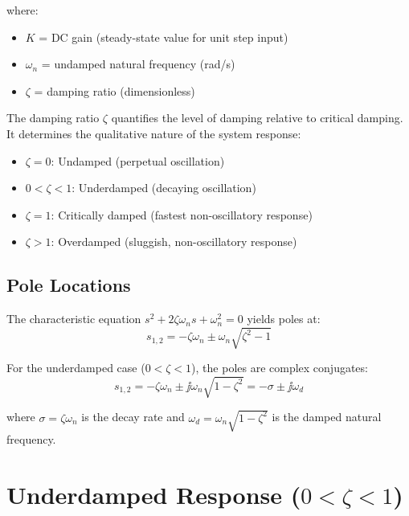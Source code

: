 where:
\begin{itemize}
    \item $K$ = DC gain (steady-state value for unit step input)
    \item $\omega_n$ = undamped natural frequency (rad/s)
    \item $\zeta$ = damping ratio (dimensionless)
\end{itemize}

\begin{definitionbox}[title=Definition: Damping Ratio]
The damping ratio $\zeta$ quantifies the level of damping relative to critical damping. It determines the qualitative nature of the system response:
\begin{itemize}
    \item $\zeta = 0$: Undamped (perpetual oscillation)
    \item $0 < \zeta < 1$: Underdamped (decaying oscillation)
    \item $\zeta = 1$: Critically damped (fastest non-oscillatory response)
    \item $\zeta > 1$: Overdamped (sluggish, non-oscillatory response)
\end{itemize}
\end{definitionbox}

\subsection{Pole Locations}

The characteristic equation $s^2 + 2\zeta\omega_n s + \omega_n^2 = 0$ yields poles at:
\begin{equation}
\boxed{s_{1,2} = -\zeta\omega_n \pm \omega_n\sqrt{\zeta^2 - 1}}
\label{eq:second_order_poles}
\end{equation}

For the underdamped case ($0 < \zeta < 1$), the poles are complex conjugates:
\begin{equation}
s_{1,2} = -\zeta\omega_n \pm \jj\omega_n\sqrt{1 - \zeta^2} = -\sigma \pm \jj\omega_d
\end{equation}

where $\sigma = \zeta\omega_n$ is the decay rate and $\omega_d = \omega_n\sqrt{1-\zeta^2}$ is the damped natural frequency.

\section{Underdamped Response ($0 < \zeta < 1$)}
\label{sec:underdamped}

